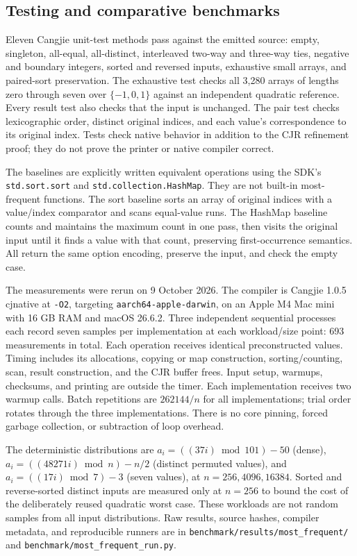 \subsection{Testing and comparative benchmarks}

Eleven Cangjie unit-test methods pass against the emitted source: empty,
singleton, all-equal, all-distinct, interleaved two-way and three-way ties,
negative and boundary integers, sorted and reversed inputs, exhaustive
small arrays, and paired-sort preservation. The exhaustive test checks all
3,280 arrays of lengths zero through seven over $\{-1,0,1\}$ against an
independent quadratic reference. Every result test also checks that the
input is unchanged. The pair test checks lexicographic order, distinct
original indices, and each value's correspondence to its original index.
Tests check native behavior in addition to the CJR refinement proof;
they do not prove the printer or native compiler correct.

The baselines are explicitly written equivalent operations using the
SDK's \texttt{std.sort.sort} and \texttt{std.collection.HashMap}. They
are not built-in most-frequent functions. The sort baseline sorts an array
of original indices with a value/index comparator and scans equal-value
runs. The HashMap baseline counts and maintains the maximum count in one
pass, then visits the original input until it finds a value with that
count, preserving first-occurrence semantics. All return the same option
encoding, preserve the input, and check the empty case.

The measurements were rerun on 9 October 2026. The compiler is Cangjie 1.0.5 cjnative at \texttt{-O2}, targeting
\texttt{aarch64-apple-darwin}, on an Apple M4 Mac mini with 16 GB RAM and
macOS 26.6.2. Three independent sequential processes each record seven
samples per implementation at each workload/size point: 693 measurements
in total. Each operation receives identical preconstructed values. Timing
includes its allocations, copying or map construction, sorting/counting,
scan, result construction, and the CJR buffer frees. Input setup, warmups,
checksums, and printing are outside the timer. Each implementation receives
two warmup calls. Batch repetitions are $262144/n$ for all implementations;
trial order rotates through the three implementations. There is no core
pinning, forced garbage collection, or subtraction of loop overhead.

The deterministic distributions are
$a_i=((37i)\bmod101)-50$ (dense),
$a_i=((48271i)\bmod n)-n/2$ (distinct permuted values), and
$a_i=((17i)\bmod7)-3$ (seven values), at $n=256,4096,16384$.
Sorted and reverse-sorted distinct inputs are measured only at $n=256$
to bound the cost of the deliberately reused quadratic worst case.
These workloads are not random samples from all input distributions.
Raw results, source hashes, compiler metadata, and reproducible runners
are in \texttt{benchmark/results/most\_frequent/} and
\texttt{benchmark/most\_frequent\_run.py}.

